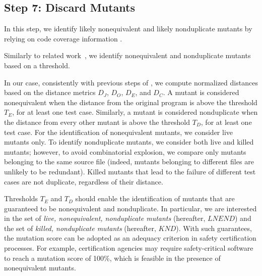 %
%
%
%
%

\subsection{Step 7: Discard Mutants}
\label{sec:algostepSeven}


In this step, we identify likely nonequivalent and likely nonduplicate mutants by relying on code coverage information .

Similarly to related work~\cite{schuler2013covering},
we identify nonequivalent and nonduplicate mutants based on a threshold.

In our case, consistently with previous steps of \APPR,
we compute normalized distances based on the distance metrics $D_J$, $D_O$, $D_E$, and $D_C$. A mutant is considered nonequivalent when the distance from the original program is above the threshold $T_E$, for at least one test case.
Similarly, a mutant is considered nonduplicate when the distance from every other mutant is above the threshold $T_D$, for at least one test case. For the identification of nonequivalent mutants, we consider live mutants only. To identify nonduplicate mutants, we consider both live and killed mutants; however, to avoid combinatorial explosion, we compare only mutants belonging to the same source file (indeed, mutants belonging to different files are unlikely to be redundant).
Killed mutants that lead to the failure of different test cases are not duplicate, regardless of their distance.

Thresholds $T_E$ and $T_D$ should enable the identification of mutants that are guaranteed to be nonequivalent and nonduplicate. In particular, we are interested in the set of \emph{live, nonequivalent, nonduplicate mutants} (hereafter, $\mathit{LNEND}$) and the set of \emph{killed, nonduplicate mutants} (hereafter, $\mathit{KND}$). With such guarantees, the mutation score can be adopted as an adequacy criterion in safety certification processes. For example, certification agencies may require safety-critical software to reach a mutation score of 100\%, which is feasible in the presence of nonequivalent mutants.

